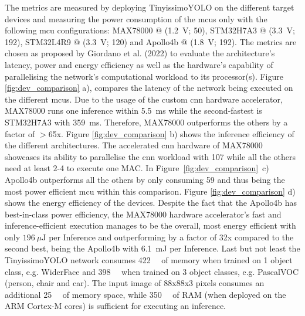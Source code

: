 \documentclass[conference]{IEEEtran}
\begin{document}
The metrics are measured by deploying TinyissimoYOLO on the different target devices and measuring the power consumption of the \glspl{mcu} only with the following \gls{mcu} configurations: MAX78000 $@$ (\SI{1.2}{\volt}; \SI{50}{}), STM32H7A3 $@$ (\SI{3.3}{\volt}; \SI{192}{}), STM32L4R9 $@$ (\SI{3.3}{\volt}; \SI{120}{}) and Apollo4b $@$ (\SI{1.8}{\volt}; \SI{192}{}). The metrics are chosen as proposed by Giordano et al. (2022) \cite{giordano_survey_2022} to evaluate the architecture's latency, power and energy efficiency as well as the hardware's capability of parallelising the network's computational workload to its processor(s). Figure \ref{fig:dev_comparison} a), compares the latency of the network being executed on the different \glspl{mcu}. Due to the usage of the custom \gls{cnn} hardware accelerator, MAX78000 runs one inference within \SI{5.5}{\milli\second} while the second-fastest is STM32H7A3 with \SI{359}{\milli\second}. Therefore, MAX78000 outperforms the others by a factor of $>$65x. Figure \ref{fig:dev_comparison} b) shows the inference efficiency of the different architectures. The accelerated \gls{cnn} hardware of MAX78000 showcases its ability to parallelise the \gls{cnn} workload with \SI{107}{} while all the others need at least $2$-\SI{4}{} to execute one MAC. In \mbox{Figure \ref{fig:dev_comparison} c)}  Apollo4b outperforms all the others by only consuming \SI{59}{} and thus being the most power efficient \gls{mcu} within this comparison. Figure \ref{fig:dev_comparison} d) shows the energy efficiency of the devices. Despite the fact that the Apollo4b has best-in-class power efficiency, the MAX78000 hardware accelerator's fast and inference-efficient execution manages to be the overall, most energy efficient with only $\SI{196}{\mu\joule}$ per Inference and outperforming by a factor of 32x compared to the second best, being the Apollo4b with \SI{6.1}{\milli\joule} per Inference.
Last but not least the TinyissimoYOLO network consumes \SI{422}{\kilo\byte} of memory when trained on 1 object class, e.g. WiderFace and \SI{398}{\kilo\byte} when trained on 3 object classes, e.g. PascalVOC (person, chair and car). The input image of 88x88x3 pixels consumes an additional \SI{25}{\kilo\byte} of memory space, while \SI{350}{\kilo\byte} of RAM (when deployed on the ARM Cortex-M cores) is sufficient for executing an inference.  
\end{document}

